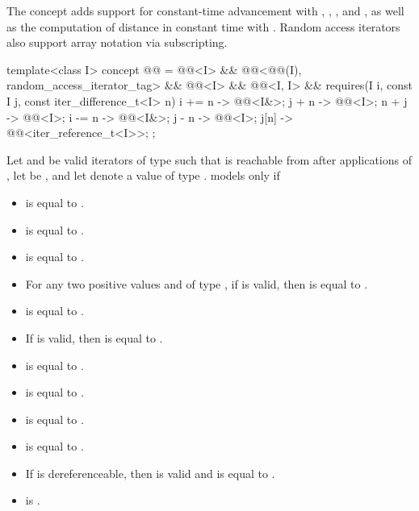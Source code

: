 \pnum
The  concept adds support for
constant-time advancement with \tcode{+=}, \tcode{+}, \tcode{-=}, and \tcode{-},
as well as the computation of distance in constant time with \tcode{-}.
Random access iterators also support array notation via subscripting.

\begin{codeblock}
template<class I>
  concept @@ =
    @@<I> &&
    @@<@@(I), random_access_iterator_tag> &&
    @@<I> &&
    @@<I, I> &&
    requires(I i, const I j, const iter_difference_t<I> n) {
      { i += n } -> @@<I&>;
      { j +  n } -> @@<I>;
      { n +  j } -> @@<I>;
      { i -= n } -> @@<I&>;
      { j -  n } -> @@<I>;
      {  j[n]  } -> @@<iter_reference_t<I>>;
    };
\end{codeblock}

\pnum
Let  and  be valid iterators of type 
such that  is reachable from 
after  applications of ,
let  be ,
and let  denote a value of type .
 models  only if
\begin{itemize}
\item {} is equal to .
\item {} is equal to .
\item {} is equal to .
\item For any two positive values
   and  of type ,
  if  is valid, then
   is equal to .
\item {} is equal to .
\item If  is valid, then
   is equal to .
\item {} is equal to .
\item {} is equal to .
\item {} is equal to .
\item {} is equal to .
\item If  is dereferenceable, then
   is valid and is equal to .
\item {} is .
\end{itemize}

